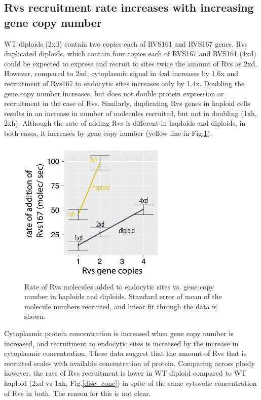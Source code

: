 \subsection{Rvs recruitment rate increases with increasing gene copy number}
 WT diploids (2xd) contain two copies each of RVS161 and RVS167 genes. Rvs duplicated diploids, which contain four copies each of RVS167 and RVS161 (4xd) could be expected to express and recruit to sites twice the amount of Rvs as 2xd. However, compared to 2xd, cytoplasmic signal in 4xd increases by 1.6x and recruitment of Rvs167 to endocytic sites increases only by 1.4x. Doubling the gene copy number increases, but does not double protein expression or recruitment in the case of Rvs. Similarly, duplicating Rvs genes in haploid cells results in an increase in number of molecules recruited, but not in doubling (1xh, 2xh). Although the rate of adding Rvs is different in haploids and diploids, in both cases, it increases by gene copy number (yellow line in Fig.\ref{disc_recruit_rate}). 

	\begin{figure}[H]
	\centering
	\hspace{-1cm}
	\includegraphics[width=7cm,height=7cm,keepaspectratio]{figures/discussion/recruit_rate_final}
	\caption[Rate of recruitment of Rvs]
{Rate of Rvs molecules added to endocytic sites vs. gene copy number in haploids and diploids. Standard error of mean of the molecule numbers recruited, and linear fit through the data is shown.
	\label{disc_recruit_rate}}
\end{figure}

	\vspace{5mm}
Cytoplasmic protein concentration is increased when gene copy number is  increased, and recruitment to endocytic sites is increased by the increase in cytoplasmic concentration. These data suggest that the amount of Rvs that is recruited scales with available concentration of protein. Comparing across ploidy however, the rate of Rvs recruitment is lower in WT diploid compared to WT haploid (2xd vs 1xh, Fig.\ref{disc_conc}) in spite of the same cytosolic concentration of Rvs in both. The reason for this is not clear. 


